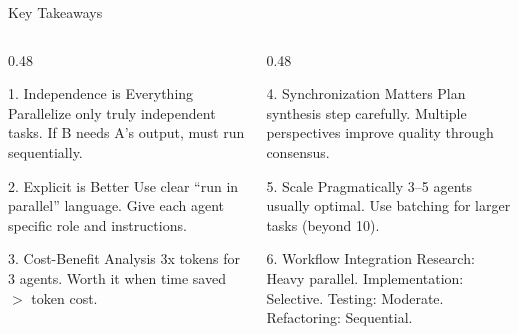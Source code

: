 \documentclass[aspectratio=169,11pt]{beamer}
\begin{document}
\begin{frame}{Key Takeaways}
    \begin{columns}[T]
        \begin{column}{0.48\textwidth}
            \begin{block}{1. Independence is Everything}
                \footnotesize
                Parallelize only truly independent tasks. If B needs A's output, must run sequentially.
            \end{block}

            \begin{block}{2. Explicit is Better}
                \footnotesize
                Use clear ``run in parallel'' language. Give each agent specific role and instructions.
            \end{block}

            \begin{block}{3. Cost-Benefit Analysis}
                \footnotesize
                3x tokens for 3 agents. Worth it when time saved $>$ token cost.
            \end{block}
        \end{column}
        \begin{column}{0.48\textwidth}
            \begin{block}{4. Synchronization Matters}
                \footnotesize
                Plan synthesis step carefully. Multiple perspectives improve quality through consensus.
            \end{block}

            \begin{block}{5. Scale Pragmatically}
                \footnotesize
                3--5 agents usually optimal. Use batching for larger tasks (beyond 10).
            \end{block}

            \begin{block}{6. Workflow Integration}
                \footnotesize
                Research: Heavy parallel. Implementation: Selective. Testing: Moderate. Refactoring: Sequential.
            \end{block}
        \end{column}
    \end{columns}
\end{frame}
\end{document}
